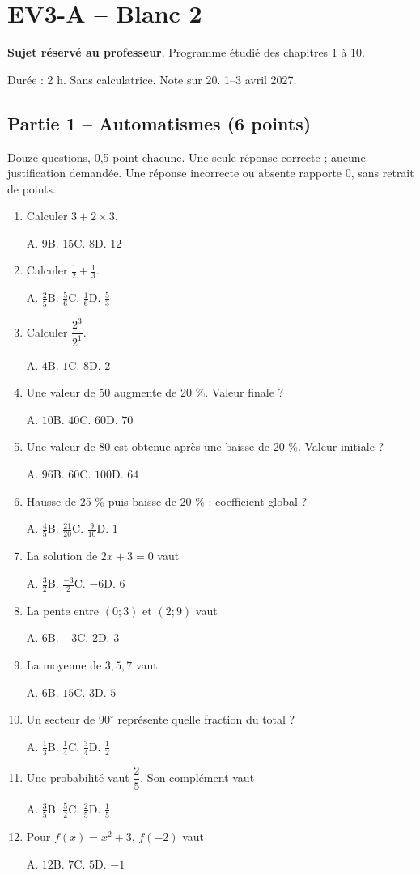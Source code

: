 \clearpage\section*{EV3-A -- Blanc 2}\label{EV3-A}
\textbf{Sujet réservé au professeur}. Programme étudié des chapitres 1 à 10.\par Durée : 2 h. Sans calculatrice. Note sur 20. 1–3 avril 2027.
\subsection*{Partie 1 -- Automatismes (6 points)}
Douze questions, 0,5 point chacune. Une seule réponse correcte ; aucune justification demandée. Une réponse incorrecte ou absente rapporte 0, sans retrait de points.
\begin{enumerate}
\item Calculer $3+2\times3$.\par A. $9$\quad B. $15$\quad C. $8$\quad D. $12$
\item Calculer $\frac12+\frac13$.\par A. $\frac{2}{5}$\quad B. $\frac{5}{6}$\quad C. $\frac{1}{6}$\quad D. $\frac{5}{3}$
\item Calculer $\dfrac{2^3}{2^{1}}$.\par A. $4$\quad B. $1$\quad C. $8$\quad D. $2$
\item Une valeur de 50 augmente de 20 \%. Valeur finale ?\par A. $10$\quad B. $40$\quad C. $60$\quad D. $70$
\item Une valeur de 80 est obtenue après une baisse de 20 \%. Valeur initiale ?\par A. $96$\quad B. $60$\quad C. $100$\quad D. $64$
\item Hausse de 25 \% puis baisse de 20 \% : coefficient global ?\par A. $\frac{4}{5}$\quad B. $\frac{21}{20}$\quad C. $\frac{9}{10}$\quad D. $1$
\item La solution de $2x+3=0$ vaut\par A. $\frac{3}{2}$\quad B. $\frac{-3}{2}$\quad C. $-6$\quad D. $6$
\item La pente entre $(0;3)$ et $(2;9)$ vaut\par A. $6$\quad B. $-3$\quad C. $2$\quad D. $3$
\item La moyenne de $3, 5, 7$ vaut\par A. $6$\quad B. $15$\quad C. $3$\quad D. $5$
\item Un secteur de $90^\circ$ représente quelle fraction du total ?\par A. $\frac{1}{3}$\quad B. $\frac{1}{4}$\quad C. $\frac{3}{4}$\quad D. $\frac{1}{2}$
\item Une probabilité vaut $\dfrac{2}{5}$. Son complément vaut\par A. $\frac{3}{5}$\quad B. $\frac{5}{2}$\quad C. $\frac{2}{5}$\quad D. $\frac{1}{5}$
\item Pour $f(x)=x^2+3$, $f(-2)$ vaut\par A. $12$\quad B. $7$\quad C. $5$\quad D. $-1$
\end{enumerate}
